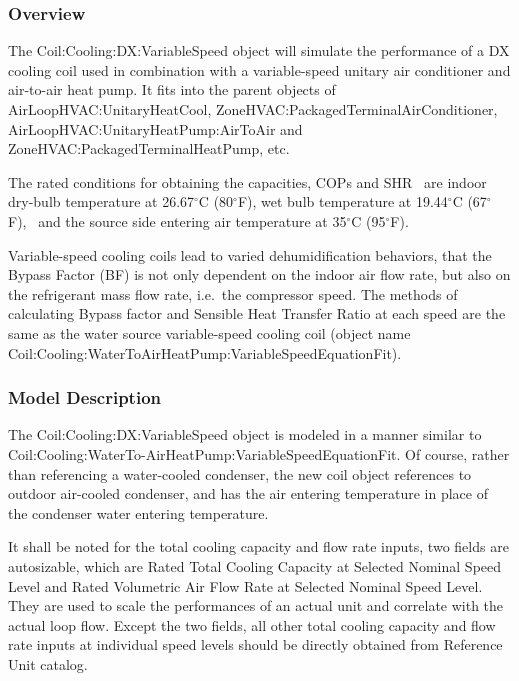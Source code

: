 \subsubsection{Overview}\label{overview-4-002}

The Coil:Cooling:DX:VariableSpeed object will simulate the performance of a DX cooling coil used in combination with a variable-speed unitary air conditioner and air-to-air heat pump. It fits into the parent objects of AirLoopHVAC:UnitaryHeatCool, ZoneHVAC:PackagedTerminalAirConditioner, AirLoopHVAC:UnitaryHeatPump:AirToAir and ZoneHVAC:PackagedTerminalHeatPump, etc.

The rated conditions for obtaining the capacities, COPs and SHR~ are indoor dry-bulb temperature at 26.67\(^{\circ}\)C (80\(^{\circ}\)F), wet bulb temperature at 19.44\(^{\circ}\)C (67\(^{\circ}\)F),~ and the source side entering air temperature at 35\(^{\circ}\)C (95\(^{\circ}\)F).

Variable-speed cooling coils lead to varied dehumidification behaviors, that the Bypass Factor (BF) is not only dependent on the indoor air flow rate, but also on the refrigerant mass flow rate, i.e.~the compressor speed. The methods of calculating Bypass factor and Sensible Heat Transfer Ratio at each speed are the same as the water source variable-speed cooling coil (object name Coil:Cooling:WaterToAirHeatPump:VariableSpeedEquationFit).

\subsubsection{Model Description}\label{model-description-3-003}

The Coil:Cooling:DX:VariableSpeed object is modeled in a manner similar to Coil:Cooling:WaterTo-AirHeatPump:VariableSpeedEquationFit. Of course, rather than referencing a water-cooled condenser, the new coil object references to outdoor air-cooled condenser, and has the air entering temperature in place of the condenser water entering temperature.

It shall be noted for the total cooling capacity and flow rate inputs, two fields are autosizable, which are Rated Total Cooling Capacity at Selected Nominal Speed Level and Rated Volumetric Air Flow Rate at Selected Nominal Speed Level. They are used to scale the performances of an actual unit and correlate with the actual loop flow. Except the two fields, all other total cooling capacity and flow rate inputs at individual speed levels should be directly obtained from Reference Unit catalog.


